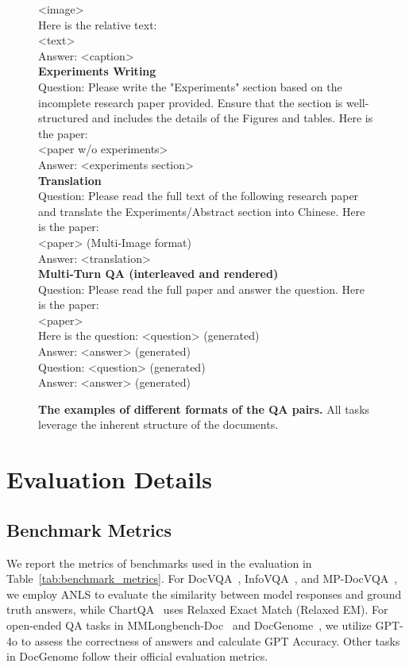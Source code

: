 \begin{figure}
{{{    <image>\\
    Here is the relative text:\\
    <text>\\
    Answer: <caption>\\ 
    \textbf{Experiments Writing} \\
    Question: Please write the "Experiments" section based on the incomplete research paper provided. Ensure that the section is well-structured and includes the details of the Figures and tables. Here is the paper:\\
    <paper w/o experiments>\\
    Answer: <experiments section>\\ 
    \textbf{Translation} \\
    Question: Please read the full text of the following research paper and translate the Experiments/Abstract section into Chinese. Here is the paper:\\
    <paper> (Multi-Image format) \\
    Answer: <translation>\\ 
    \textbf{Multi-Turn QA (interleaved and rendered)} \\
    Question: Please read the full paper and answer the question. Here is the paper:\\
    <paper>\\
    Here is the question: <question> (generated)\\
    Answer: <answer> (generated)\\
    Question: <question> (generated)\\
    Answer: <answer> (generated)
    }}
  }
  \caption{\textbf{The examples of different formats of the QA pairs.} All tasks leverage the inherent structure of the documents.}
  \label{fig:qa_example}
\end{figure}



\section{Evaluation Details}

\subsection{Benchmark Metrics}


We report the metrics of benchmarks used in the evaluation in Table~\ref{tab:benchmark_metrics}. 
For DocVQA~\cite{mathew2021docvqa}, InfoVQA~\cite{mathew2022infographicvqa}, and MP-DocVQA~\cite{tito2023mpdocvqa}, we employ ANLS to evaluate the similarity between model responses and ground truth answers, while ChartQA~\cite{masry2022chartqa} uses Relaxed Exact Match (Relaxed EM). For open-ended QA tasks in MMLongbench-Doc~\cite{ma2024mmlong} and DocGenome~\cite{xia2024docgenome}, we utilize GPT-4o to assess the correctness of answers and calculate GPT Accuracy. Other tasks in DocGenome follow their official evaluation metrics.

